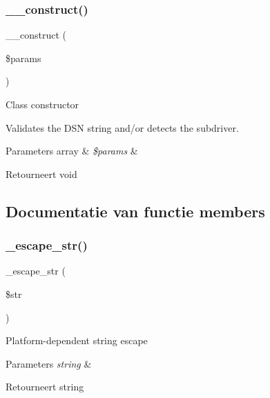 \subsubsection{\texorpdfstring{\_\_construct()}{\_\_construct()}}
{\footnotesize\ttfamily \+\_\+\+\_\+construct (\begin{DoxyParamCaption}\item[{}]{\$params }\end{DoxyParamCaption})}

Class constructor

Validates the D\+SN string and/or detects the subdriver.


\begin{DoxyParams}[1]{Parameters}
array & {\em \$params} & \\
\hline
\end{DoxyParams}
\begin{DoxyReturn}{Retourneert}
void 
\end{DoxyReturn}


\subsection{Documentatie van functie members}
\mbox{\label{class_c_i___d_b__pdo__driver_af8ef0237bfcdb19215b63fff769e7a55}} 
\subsubsection{\texorpdfstring{\_escape\_str()}{\_escape\_str()}}
{\footnotesize\ttfamily \+\_\+escape\+\_\+str (\begin{DoxyParamCaption}\item[{}]{\$str }\end{DoxyParamCaption})\hspace{0.3cm}{\ttfamily [protected]}}

Platform-\/dependent string escape


\begin{DoxyParams}{Parameters}
{\em string} & \\
\hline
\end{DoxyParams}
\begin{DoxyReturn}{Retourneert}
string 
\end{DoxyReturn}
\mbox{\label{class_c_i___d_b__pdo__driver_a114ab675d89bf8324a41785fb475e86d}} 
